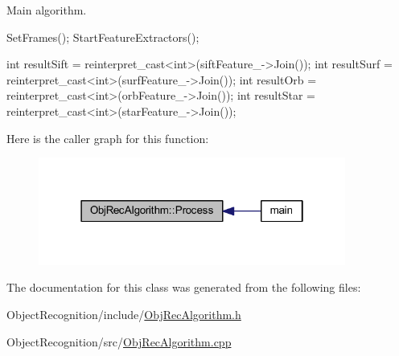 Main algorithm. 


\begin{DoxyCode}
{
        SetFrames();
        StartFeatureExtractors();

        int resultSift = reinterpret_cast<int>(siftFeature_->Join());
        int resultSurf = reinterpret_cast<int>(surfFeature_->Join());
        int resultOrb = reinterpret_cast<int>(orbFeature_->Join());
        int resultStar = reinterpret_cast<int>(starFeature_->Join());
}
\end{DoxyCode}


Here is the caller graph for this function\-:\nopagebreak
\begin{figure}[H]
\begin{center}
\leavevmode
\includegraphics[width=286pt]{class_obj_rec_algorithm_a66ef61bfa87fdce6bf270948636d61a9_icgraph}
\end{center}
\end{figure}




The documentation for this class was generated from the following files\-:\begin{DoxyCompactItemize}
\item 
Object\-Recognition/include/\hyperlink{_obj_rec_algorithm_8h}{Obj\-Rec\-Algorithm.\-h}\item 
Object\-Recognition/src/\hyperlink{_obj_rec_algorithm_8cpp}{Obj\-Rec\-Algorithm.\-cpp}\end{DoxyCompactItemize}

